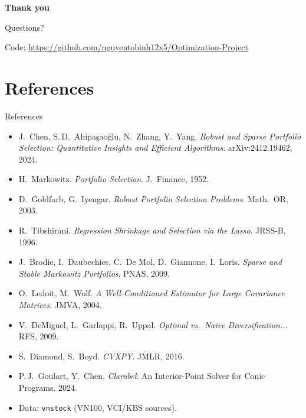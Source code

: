 \documentclass[aspectratio=169]{beamer}
\begin{document}
\begin{frame}
  \centering
  \Large \textbf{Thank you}
  \vspace{0.5cm}

  \normalsize Questions?
  \vspace{0.5cm}

  \footnotesize Code: \url{https://github.com/nguyentobinh12x5/Optimization-Project}
\end{frame}

\section*{References}

\begin{frame}{References}
  \footnotesize
  \begin{itemize}
    \item J.\ Chen, S.\,D.\ Ahipa\c{s}ao\u{g}lu, N.\ Zhang, Y.\ Yang. \textit{Robust and Sparse
          Portfolio Selection: Quantitative Insights and Efficient Algorithms}. arXiv:2412.19462, 2024.
    \item H.\ Markowitz. \textit{Portfolio Selection}. J.\ Finance, 1952.
    \item D.\ Goldfarb, G.\ Iyengar. \textit{Robust Portfolio Selection Problems}. Math.\ OR, 2003.
    \item R.\ Tibshirani. \textit{Regression Shrinkage and Selection via the Lasso}. JRSS-B, 1996.
    \item J.\ Brodie, I.\ Daubechies, C.\ De Mol, D.\ Giannone, I.\ Loris. \textit{Sparse and
          Stable Markowitz Portfolios}. PNAS, 2009.
    \item O.\ Ledoit, M.\ Wolf. \textit{A Well-Conditioned Estimator for Large Covariance Matrices}. JMVA, 2004.
    \item V.\ DeMiguel, L.\ Garlappi, R.\ Uppal. \textit{Optimal vs.\ Naive Diversification...} RFS, 2009.
    \item S.\ Diamond, S.\ Boyd. \textit{CVXPY}. JMLR, 2016.
    \item P.\,J.\ Goulart, Y.\ Chen. \textit{Clarabel}: An Interior-Point Solver for Conic
          Programs. 2024.
    \item Data: \texttt{vnstock} (VN100, VCI/KBS sources).
  \end{itemize}
\end{frame}
\end{document}
